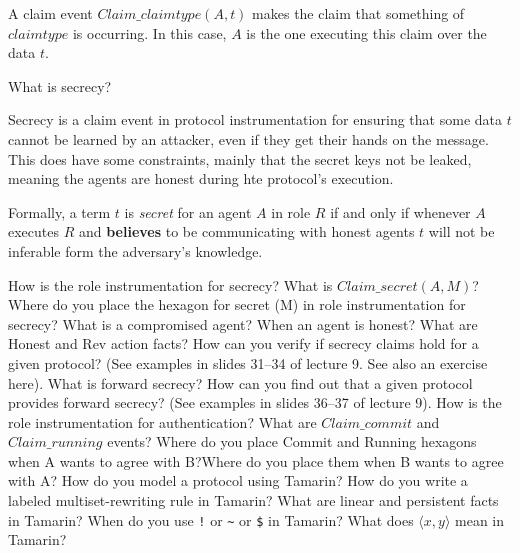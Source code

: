 \begin{questions}
\begin{solution}
    A claim event $Claim\_claimtype(A,t)$ makes the claim that something of $claimtype$ is occurring.
    In this case, $A$ is the one executing this claim over the data $t$.
  \end{solution}

\question{} What is secrecy?
  \begin{solution}
    Secrecy is a claim event in protocol instrumentation for ensuring that some data $t$ cannot be learned by an attacker, even if they get their hands on the message.
    This does have some constraints, mainly that the secret keys not be leaked, meaning the agents are honest during hte protocol's execution.

    Formally, a term $t$ is \emph{secret} for an agent $A$ in role $R$ if and only if whenever $A$ executes $R$ and \textbf{believes} to be communicating with honest agents $t$ will not be inferable form the adversary's knowledge.
  \end{solution}

\question{} How is the role instrumentation for secrecy? What is $Claim\_secret(A,M)$? Where do you place the hexagon for secret (M) in role instrumentation for secrecy?
\question{} What is a compromised agent? When an agent is honest? What are Honest and Rev action facts?
\question{} How can you verify if secrecy claims hold for a given protocol? (See examples in slides 31--34 of lecture 9. See also an exercise here).
\question{} What is forward secrecy?
\question{} How can you find out that a given protocol provides forward secrecy? (See examples in slides 36--37 of lecture 9).
\question{} How is the role instrumentation for authentication? What are $Claim\_commit$ and $Claim\_running$ events? Where do you place Commit and Running hexagons when A wants to agree with B?\@ Where do you place them when B wants to agree with A?\@
\question{} How do you model a protocol using Tamarin? How do you write a labeled multiset-rewriting rule in Tamarin?
\question{} What are linear and persistent facts in Tamarin? When do you use \texttt{!} or \texttt{\textasciitilde{}} or \texttt{\$} in Tamarin?
\question{} What does $\langle x, y \rangle$ mean in Tamarin?
\end{questions}
